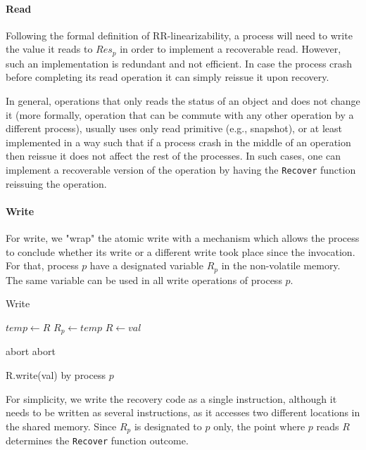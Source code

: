 \paragraph*{Read}

Following the formal definition of RR-linearizability, a process will need to write the value it reads to $Res_p$ in order to implement a recoverable read. However, such an implementation is redundant and not efficient. In case the process crash before completing its read operation it can simply reissue it upon recovery.

In general, operations that only reads the status of an object and does not change it (more formally, operation that can be commute with any other operation by a different process), usually uses only read primitive (e.g., snapshot), or at least implemented in a way such that if a process crash in the middle of an operation then reissue it does not affect the rest of the processes. In such cases, one can implement a recoverable version of the operation by having the \texttt{Recover} function reissuing the operation.

\paragraph*{Write}
For write, we "wrap" the atomic write with a mechanism which allows the process to conclude whether its write or a different write took place since the invocation. For that, process $p$ have a designated variable $R_p$ in the non-volatile memory. The same variable can be used in all write operations of process $p$.

\begin{algorithm}
	\caption{Write}\label{recoverable write}
	\begin{algorithmic}[1]	
		\State $temp \gets R$
		\State $R_p \gets temp$
		\State $R \gets val$
		\EndProcedure
		
		 \Return abort
		\EndIf
		 \Return abort
		\EndIf
		\EndProcedure
	\end{algorithmic}
	\caption{R.write(val) by process $p$}
\end{algorithm}

For simplicity, we write the recovery code as a single instruction, although it needs to be written as several instructions, as it accesses two different locations in the shared memory. Since $R_p$ is designated to $p$ only, the point where $p$ reads $R$ determines the \texttt{Recover} function outcome.

